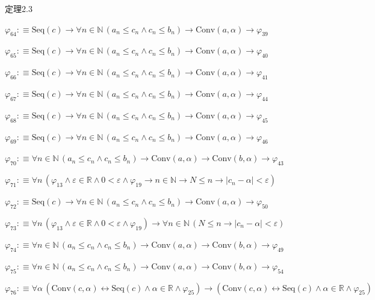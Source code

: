 \begin{fullproof}{定理2.3}
\begin{abbrevlist}
\item $\varphi_{64} :\equiv \mathrm{Seq}(c) \to \forall n \in \mathbb{N}\,(a_{n} \leq c_{n} \land c_{n} \leq b_{n}) \to \mathrm{Conv}(a,\alpha) \to \varphi_{39}$
\item $\varphi_{65} :\equiv \mathrm{Seq}(c) \to \forall n \in \mathbb{N}\,(a_{n} \leq c_{n} \land c_{n} \leq b_{n}) \to \mathrm{Conv}(a,\alpha) \to \varphi_{40}$
\item $\varphi_{66} :\equiv \mathrm{Seq}(c) \to \forall n \in \mathbb{N}\,(a_{n} \leq c_{n} \land c_{n} \leq b_{n}) \to \mathrm{Conv}(a,\alpha) \to \varphi_{41}$
\item $\varphi_{67} :\equiv \mathrm{Seq}(c) \to \forall n \in \mathbb{N}\,(a_{n} \leq c_{n} \land c_{n} \leq b_{n}) \to \mathrm{Conv}(a,\alpha) \to \varphi_{44}$
\item $\varphi_{68} :\equiv \mathrm{Seq}(c) \to \forall n \in \mathbb{N}\,(a_{n} \leq c_{n} \land c_{n} \leq b_{n}) \to \mathrm{Conv}(a,\alpha) \to \varphi_{45}$
\item $\varphi_{69} :\equiv \mathrm{Seq}(c) \to \forall n \in \mathbb{N}\,(a_{n} \leq c_{n} \land c_{n} \leq b_{n}) \to \mathrm{Conv}(a,\alpha) \to \varphi_{46}$
\item $\varphi_{70} :\equiv \forall n \in \mathbb{N}\,(a_{n} \leq c_{n} \land c_{n} \leq b_{n}) \to \mathrm{Conv}(a,\alpha) \to \mathrm{Conv}(b,\alpha) \to \varphi_{43}$
\item $\varphi_{71} :\equiv \forall n\,(\varphi_{13} \land \varepsilon \in \mathbb{R} \land 0 < \varepsilon \land \varphi_{19} \to n \in \mathbb{N} \to N \leq n \to \lvert c_{n} - \alpha \rvert < \varepsilon)$
\item $\varphi_{72} :\equiv \mathrm{Seq}(c) \to \forall n \in \mathbb{N}\,(a_{n} \leq c_{n} \land c_{n} \leq b_{n}) \to \mathrm{Conv}(a,\alpha) \to \varphi_{50}$
\item $\varphi_{73} :\equiv \forall n\,(\varphi_{13} \land \varepsilon \in \mathbb{R} \land 0 < \varepsilon \land \varphi_{19}) \to \forall n \in \mathbb{N}\,(N \leq n \to \lvert c_{n} - \alpha \rvert < \varepsilon)$
\item $\varphi_{74} :\equiv \forall n \in \mathbb{N}\,(a_{n} \leq c_{n} \land c_{n} \leq b_{n}) \to \mathrm{Conv}(a,\alpha) \to \mathrm{Conv}(b,\alpha) \to \varphi_{49}$
\item $\varphi_{75} :\equiv \forall n \in \mathbb{N}\,(a_{n} \leq c_{n} \land c_{n} \leq b_{n}) \to \mathrm{Conv}(a,\alpha) \to \mathrm{Conv}(b,\alpha) \to \varphi_{54}$
\item $\varphi_{76} :\equiv \forall \alpha\,(\mathrm{Conv}(c,\alpha) \leftrightarrow \mathrm{Seq}(c) \land \alpha \in \mathbb{R} \land \varphi_{25}) \to (\mathrm{Conv}(c,\alpha) \leftrightarrow \mathrm{Seq}(c) \land \alpha \in \mathbb{R} \land \varphi_{25})$

\end{abbrevlist}
\end{fullproof}

